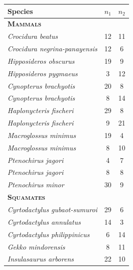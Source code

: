 \begin{frame}
\begin{columns}[c]
        \begin{table}%
            \scriptsize
            \addtolength{\tabcolsep}{-0.09cm}
            \centering
            \begin{tabular}{ l c c }
                \textbf{Species} & {\boldmath $n_1$} & {\boldmath $n_2$} \\
                \hline
                \textbf{\textsc{Mammals}} & & \\
                \emph{Crocidura beatus}             & 12 & 11 \\
                \emph{Crocidura negrina-panayensis} & 12 & 6  \\
                \emph{Hipposideros obscurus}        & 19 & 9  \\
                \emph{Hipposideros pygmaeus}        & 3  & 12 \\
                \emph{Cynopterus brachyotis}        & 20 & 8  \\
                \emph{Cynopterus brachyotis}        & 8  & 14 \\
                \emph{Haplonycteris fischeri}       & 29 & 8  \\
                \emph{Haplonycteris fischeri}       & 9  & 21 \\
                \emph{Macroglossus minimus}         & 19 & 4  \\
                \emph{Macroglossus minimus}         & 8  & 10 \\
                \emph{Ptenochirus jagori}           & 4  & 7  \\
                \emph{Ptenochirus jagori}           & 8  & 8  \\
                \emph{Ptenochirus minor}            & 30 & 9  \\
                \textbf{\textsc{Squamates}} & & \\
                \emph{Cyrtodactylus gubaot-sumuroi} & 29 & 6  \\
                \emph{Cyrtodactylus annulatus}      & 14 & 3  \\
                \emph{Cyrtodactylus philippinicus}  & 6  & 14 \\
                \emph{Gekko mindorensis}            & 8  & 11 \\
                \emph{Insulasaurus arborens}        & 22 & 10 \\

\end{tabular}
\end{table}
\end{columns}
\end{frame}
